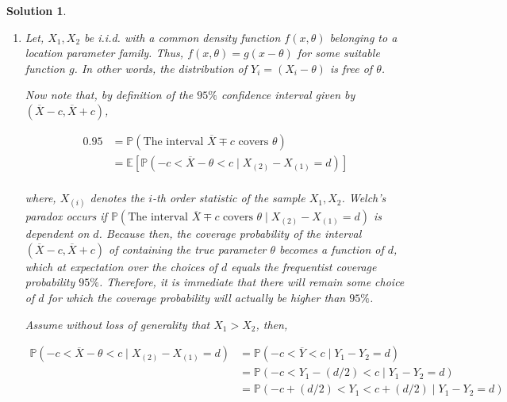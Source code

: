 \documentclass[12pt]{article}
\theoremstyle{problemstyle}
\newtheorem*{solution*}{Solution}
\newcommand{\prob}{\mathbb{P}}
\newcommand{\E}{\mathbb{E}}
\begin{document}
\begin{solution*}
\begin{enumerate}
        \begin{align*}
            & \prob\left[ \overline{X} - c \leq \theta \leq \overline{X} + c  \right] = 0.95\\
            \Rightarrow \quad & \dfrac{2c}{(X_{(1)} - X_{(2)} + 1)} = 0.95\\
            \Rightarrow \quad & c = 0.475 \left( 1 + X_{(1)} - X_{(2)} \right)
        \end{align*}

        Therefore, the $95\%$ credible interval for $\theta$ is given by 
        
        $$
        \left[ \overline{X} - 0.475 \left( 1 + X_{(1)} - X_{(2)} \right), \overline{X} + 0.475 \left( 1 + X_{(1)} - X_{(2)} \right) \right]
        $$

    \item[(b)] Let, $X_1, X_2$ be i.i.d. with a common density function $f(x, \theta)$ belonging to a location parameter family. Thus, $f(x, \theta) = g(x - \theta)$ for some suitable function $g$. In other words, the distribution of $Y_i = (X_i - \theta)$ is free of $\theta$. 
    
    Now note that, by definition of the $95\%$ confidence interval given by $(\overline{X} - c, \overline{X} + c)$, 

    \begin{align*}
        0.95 & = \prob(\text{The interval } \overline{X} \mp c \text{ covers } \theta) \\
        & = \E\left[ \prob(-c < \overline{X} - \theta < c \mid X_{(2)} - X_{(1)} = d) \right]\\
    \end{align*}

    \noindent where, $X_{(i)}$ denotes the $i$-th order statistic of the sample $X_1, X_2$. Welch's paradox occurs if $\prob(\text{The interval } \overline{X} \mp c \text{ covers } \theta \mid X_{(2)} - X_{(1)} = d)$ is dependent on $d$. Because then, the coverage probability of the interval $(\overline{X} - c, \overline{X} + c)$ of containing the true parameter $\theta$ becomes a function of $d$, which at expectation over the choices of $d$ equals the frequentist coverage probability $95\%$. Therefore, it is immediate that there will remain some choice of $d$ for which the coverage probability will actually be higher than $95\%$. 
    
    Assume without loss of generality that $X_1 > X_2$, then, 

    \begin{align*}
        \prob(-c < \overline{X} - \theta < c \mid X_{(2)} - X_{(1)} = d)
        & = \prob(-c < \overline{Y} < c \mid Y_1 - Y_2 = d)\\
        & = \prob(-c < Y_1 - (d/2) < c \mid Y_1 - Y_2 = d)\\
        & = \prob(-c + (d/2) < Y_1 < c + (d/2) \mid Y_1 - Y_2 = d)
    \end{align*}


\end{enumerate}
\end{solution*}
\end{document}
